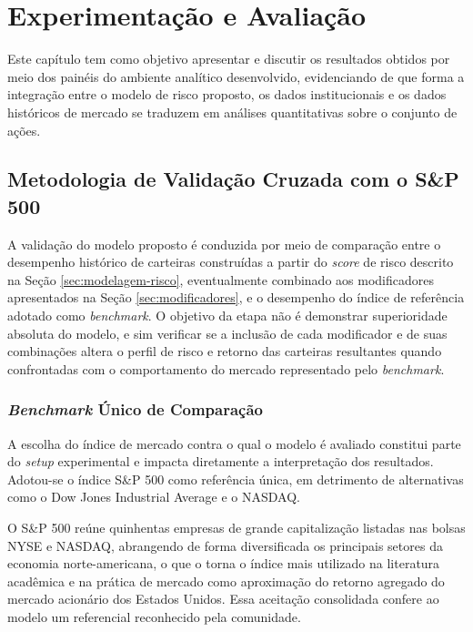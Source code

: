 \chapter{Experimentação e Avaliação}
\label{chap:experimentacao}

Este capítulo tem como objetivo apresentar e discutir os resultados obtidos por meio dos painéis do ambiente analítico desenvolvido, evidenciando de que forma a integração entre o modelo de risco proposto, os dados institucionais e os dados históricos de mercado se traduzem em análises quantitativas sobre o conjunto de ações.

\section{Metodologia de Validação Cruzada com o S\&P 500}
\label{sec:validacao-sp500}

A validação do modelo proposto é conduzida por meio de comparação entre o desempenho histórico de carteiras construídas a partir do \textit{score} de risco descrito na Seção \ref{sec:modelagem-risco}, eventualmente combinado aos modificadores apresentados na Seção \ref{sec:modificadores}, e o desempenho do índice de referência adotado como \textit{benchmark}. O objetivo da etapa não é demonstrar superioridade absoluta do modelo, e sim verificar se a inclusão de cada modificador e de suas combinações altera o perfil de risco e retorno das carteiras resultantes quando confrontadas com o comportamento do mercado representado pelo \textit{benchmark}.

\subsection{\textit{Benchmark} Único de Comparação}

A escolha do índice de mercado contra o qual o modelo é avaliado constitui parte do \textit{setup} experimental e impacta diretamente a interpretação dos resultados. Adotou-se o índice S\&P 500 como referência única, em detrimento de alternativas como o Dow Jones Industrial Average e o NASDAQ.

O S\&P 500 reúne quinhentas empresas de grande capitalização listadas nas bolsas NYSE e NASDAQ, abrangendo de forma diversificada os principais setores da economia norte-americana, o que o torna o índice mais utilizado na literatura acadêmica e na prática de mercado como aproximação do retorno agregado do mercado acionário dos Estados Unidos. Essa aceitação consolidada confere ao modelo um referencial reconhecido pela comunidade.

